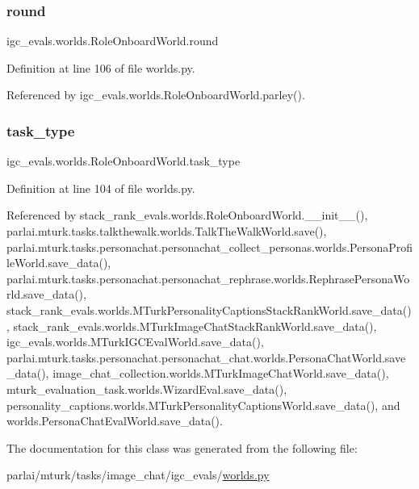 \subsubsection{\texorpdfstring{round}{round}}
{\footnotesize\ttfamily igc\+\_\+evals.\+worlds.\+Role\+Onboard\+World.\+round}



Definition at line 106 of file worlds.\+py.



Referenced by igc\+\_\+evals.\+worlds.\+Role\+Onboard\+World.\+parley().

\mbox{\label{classigc__evals_1_1worlds_1_1RoleOnboardWorld_aa4474e6170fb62445d09455a09377b1c}} 
\subsubsection{\texorpdfstring{task\+\_\+type}{task\_type}}
{\footnotesize\ttfamily igc\+\_\+evals.\+worlds.\+Role\+Onboard\+World.\+task\+\_\+type}



Definition at line 104 of file worlds.\+py.



Referenced by stack\+\_\+rank\+\_\+evals.\+worlds.\+Role\+Onboard\+World.\+\_\+\+\_\+init\+\_\+\+\_\+(), parlai.\+mturk.\+tasks.\+talkthewalk.\+worlds.\+Talk\+The\+Walk\+World.\+save(), parlai.\+mturk.\+tasks.\+personachat.\+personachat\+\_\+collect\+\_\+personas.\+worlds.\+Persona\+Profile\+World.\+save\+\_\+data(), parlai.\+mturk.\+tasks.\+personachat.\+personachat\+\_\+rephrase.\+worlds.\+Rephrase\+Persona\+World.\+save\+\_\+data(), stack\+\_\+rank\+\_\+evals.\+worlds.\+M\+Turk\+Personality\+Captions\+Stack\+Rank\+World.\+save\+\_\+data(), stack\+\_\+rank\+\_\+evals.\+worlds.\+M\+Turk\+Image\+Chat\+Stack\+Rank\+World.\+save\+\_\+data(), igc\+\_\+evals.\+worlds.\+M\+Turk\+I\+G\+C\+Eval\+World.\+save\+\_\+data(), parlai.\+mturk.\+tasks.\+personachat.\+personachat\+\_\+chat.\+worlds.\+Persona\+Chat\+World.\+save\+\_\+data(), image\+\_\+chat\+\_\+collection.\+worlds.\+M\+Turk\+Image\+Chat\+World.\+save\+\_\+data(), mturk\+\_\+evaluation\+\_\+task.\+worlds.\+Wizard\+Eval.\+save\+\_\+data(), personality\+\_\+captions.\+worlds.\+M\+Turk\+Personality\+Captions\+World.\+save\+\_\+data(), and worlds.\+Persona\+Chat\+Eval\+World.\+save\+\_\+data().



The documentation for this class was generated from the following file\+:\begin{DoxyCompactItemize}
\item 
parlai/mturk/tasks/image\+\_\+chat/igc\+\_\+evals/\hyperlink{parlai_2mturk_2tasks_2image__chat_2igc__evals_2worlds_8py}{worlds.\+py}\end{DoxyCompactItemize}
